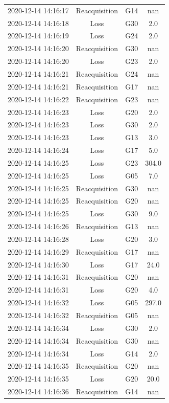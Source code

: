 \begin{enumerate}
\begin{longtabu}{cccc}
2020{-}12{-}14 14:16:17&Reacquisition&G14&nan\\%
2020{-}12{-}14 14:16:18&Loss&G30&2.0\\%
2020{-}12{-}14 14:16:19&Loss&G24&2.0\\%
2020{-}12{-}14 14:16:20&Reacquisition&G30&nan\\%
2020{-}12{-}14 14:16:20&Loss&G23&2.0\\%
2020{-}12{-}14 14:16:21&Reacquisition&G24&nan\\%
2020{-}12{-}14 14:16:21&Reacquisition&G17&nan\\%
2020{-}12{-}14 14:16:22&Reacquisition&G23&nan\\%
2020{-}12{-}14 14:16:23&Loss&G20&2.0\\%
2020{-}12{-}14 14:16:23&Loss&G30&2.0\\%
2020{-}12{-}14 14:16:23&Loss&G13&3.0\\%
2020{-}12{-}14 14:16:24&Loss&G17&5.0\\%
2020{-}12{-}14 14:16:25&Loss&G23&304.0\\%
2020{-}12{-}14 14:16:25&Loss&G05&7.0\\%
2020{-}12{-}14 14:16:25&Reacquisition&G30&nan\\%
2020{-}12{-}14 14:16:25&Reacquisition&G20&nan\\%
2020{-}12{-}14 14:16:25&Loss&G30&9.0\\%
2020{-}12{-}14 14:16:26&Reacquisition&G13&nan\\%
2020{-}12{-}14 14:16:28&Loss&G20&3.0\\%
2020{-}12{-}14 14:16:29&Reacquisition&G17&nan\\%
2020{-}12{-}14 14:16:30&Loss&G17&24.0\\%
2020{-}12{-}14 14:16:31&Reacquisition&G20&nan\\%
2020{-}12{-}14 14:16:31&Loss&G20&4.0\\%
2020{-}12{-}14 14:16:32&Loss&G05&297.0\\%
2020{-}12{-}14 14:16:32&Reacquisition&G05&nan\\%
2020{-}12{-}14 14:16:34&Loss&G30&2.0\\%
2020{-}12{-}14 14:16:34&Reacquisition&G30&nan\\%
2020{-}12{-}14 14:16:34&Loss&G14&2.0\\%
2020{-}12{-}14 14:16:35&Reacquisition&G20&nan\\%
2020{-}12{-}14 14:16:35&Loss&G20&20.0\\%
2020{-}12{-}14 14:16:36&Reacquisition&G14&nan\\%

\end{longtabu}
\end{enumerate}
